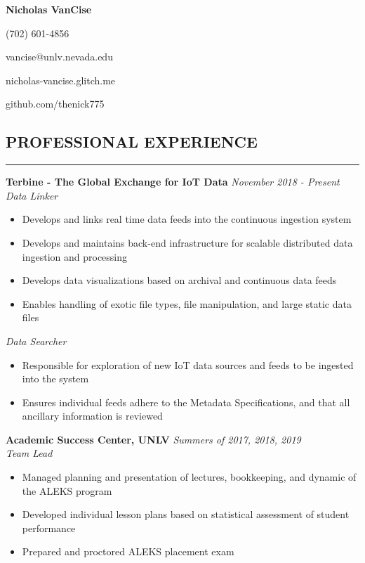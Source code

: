 \documentclass{res}
\begin{document}
	\thispagestyle{empty} %
	\centerline{\bf \Large{Nicholas VanCise}}
	\centerline{(702) 601-4856}
	\centerline{vancise@unlv.nevada.edu}
  \centerline{nicholas-vancise.glitch.me}
  \centerline{github.com/thenick775}
  \vspace{-10pt}

	\begin{resume}

		\section{{PROFESSIONAL EXPERIENCE}}
    \noindent\rule[0.5ex]{\linewidth}{1pt}
		{\bf Terbine - The Global Exchange for IoT Data} \hfill \emph{November 2018 - Present} \\
			\emph{Data Linker}

			\begin{itemize} \itemsep -2pt
				\item Develops and links real time data feeds into the continuous ingestion system
				\item Develops and maintains back-end infrastructure for scalable distributed data ingestion and processing
				\item Develops data visualizations based on archival and continuous data feeds
				\item Enables handling of exotic file types, file manipulation, and large static data files
			\end{itemize} \vspace{-2mm}

			\emph{Data Searcher}

			\begin{itemize} \itemsep -2pt
				\item Responsible for exploration of new IoT data sources and feeds to be ingested into the system
				\item Ensures individual feeds adhere to the Metadata Specifications, and that all ancillary information is reviewed
			\end{itemize} \vspace{-2mm}

		{\bf Academic Success Center, UNLV} \hfill \emph{Summers of 2017, 2018, 2019} \\
			\emph{Team Lead}

			\begin{itemize} \itemsep -2pt
				\item Managed planning and presentation of lectures, bookkeeping, and dynamic of the ALEKS program
				\item Developed individual lesson plans based on statistical assessment of student performance
        \item Prepared and proctored ALEKS placement exam
			\end{itemize}


\end{resume}
\end{document}
